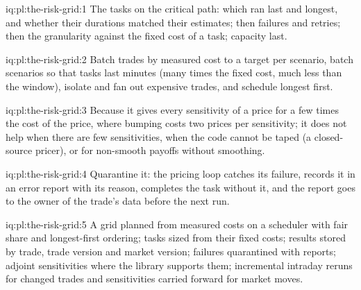 \begin{solution}{iq:pl:the-risk-grid:1}
The tasks on the critical path: which ran last and longest, and whether their durations matched their estimates; then failures and retries;
then the granularity against the fixed cost of a task; capacity last.
\end{solution}

\begin{solution}{iq:pl:the-risk-grid:2}
Batch trades by measured cost to a target per scenario, batch scenarios so that tasks last minutes (many times the fixed cost, much less than
the window), isolate and fan out expensive trades, and schedule longest first.
\end{solution}

\begin{solution}{iq:pl:the-risk-grid:3}
Because it gives every sensitivity of a price for a few times the cost of the price, where bumping costs two prices per sensitivity; it does
not help when there are few sensitivities, when the code cannot be taped (a closed-source pricer), or for non-smooth payoffs without smoothing.
\end{solution}

\begin{solution}{iq:pl:the-risk-grid:4}
Quarantine it: the pricing loop catches its failure, records it in an error report with its reason, completes the task without it, and the
report goes to the owner of the trade's data before the next run.
\end{solution}

\begin{solution}{iq:pl:the-risk-grid:5}
A grid planned from measured costs on a scheduler with fair share and longest-first ordering; tasks sized from their fixed costs; results
stored by trade, trade version and market version; failures quarantined with reports; adjoint sensitivities where the library supports them;
incremental intraday reruns for changed trades and sensitivities carried forward for market moves.
\end{solution}
